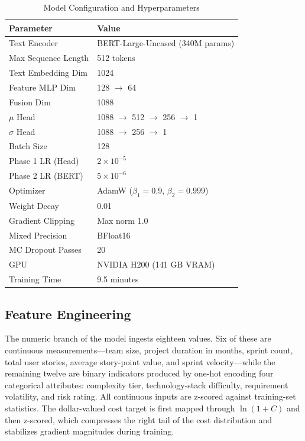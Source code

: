\documentclass[conference]{IEEEtran}
\begin{document}
\begin{table}[htbp]
\centering
\caption{Model Configuration and Hyperparameters}
\label{tab:config}
\begin{tabular}{ll}
\toprule
\textbf{Parameter} & \textbf{Value} \\
\midrule
Text Encoder & BERT-Large-Uncased (340M params) \\
Max Sequence Length & 512 tokens \\
Text Embedding Dim & 1024 \\
Feature MLP Dim & 128 $\rightarrow$ 64 \\
Fusion Dim & 1088 \\
$\mu$ Head & 1088 $\rightarrow$ 512 $\rightarrow$ 256 $\rightarrow$ 1 \\
$\sigma$ Head & 1088 $\rightarrow$ 256 $\rightarrow$ 1 \\
\midrule
Batch Size & 128 \\
Phase 1 LR (Head) & $2 \times 10^{-5}$ \\
Phase 2 LR (BERT) & $5 \times 10^{-6}$ \\
Optimizer & AdamW ($\beta_1=0.9$, $\beta_2=0.999$) \\
Weight Decay & 0.01 \\
Gradient Clipping & Max norm 1.0 \\
Mixed Precision & BFloat16 \\
MC Dropout Passes & 20 \\
\midrule
GPU & NVIDIA H200 (141 GB VRAM) \\
Training Time & 9.5 minutes \\
\bottomrule
\end{tabular}
\end{table}

\subsection{Feature Engineering}

The numeric branch of the model ingests eighteen values. Six of these are continuous measurements---team size, project duration in months, sprint count, total user stories, average story-point value, and sprint velocity---while the remaining twelve are binary indicators produced by one-hot encoding four categorical attributes: complexity tier, technology-stack difficulty, requirement volatility, and risk rating. All continuous inputs are z-scored against training-set statistics. The dollar-valued cost target is first mapped through $\ln(1+C)$ and then z-scored, which compresses the right tail of the cost distribution and stabilizes gradient magnitudes during training.
\end{document}
